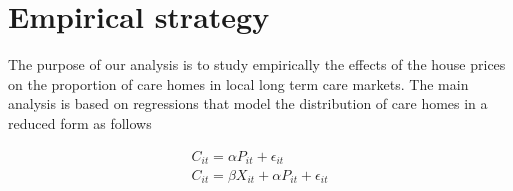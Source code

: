 \documentclass[12pt,letterpaper]{article}
\begin{document}
    {}
 
 \section{Empirical strategy}
 \label{sec: empirical strategy}
 
 The purpose of our analysis is to study empirically the effects of the house prices on the proportion of care homes in local
  long term care markets. The main analysis is based on regressions that model 
 the distribution of care homes in a reduced form as follows
  
%      
 
 \begin{equation}
  \label{equation: carehomes_prices}
  \begin{aligned}
    C_{it} =\alpha P_{it} + \epsilon_{it} \\
    C_{it} =\beta X_{it} + \alpha P_{it} + \epsilon_{it}      
  \end{aligned}
\end{equation}
\end{document}
